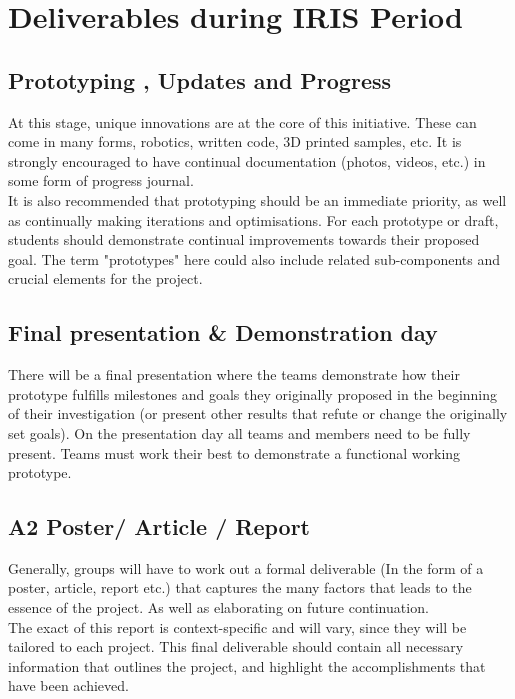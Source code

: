 \documentclass{report}
\begin{document}
       
	\section{Deliverables during IRIS Period}
	\subsection{Prototyping , Updates and Progress}
        At this stage, unique innovations are at the core of this initiative. These can come in many forms, robotics, written code, 3D printed samples, etc. It is strongly encouraged to have continual documentation (photos, videos, etc.) in some form of progress journal.\\
        
        \noindent 
        It is also recommended that prototyping should be an immediate priority, as well as continually making iterations and optimisations. For each prototype or draft, students should demonstrate continual improvements towards their proposed goal. The term "prototypes" here could also include related sub-components and crucial elements for the project.\\
        
        \subsection{Final presentation \& Demonstration day}
        There will be a final presentation where the teams demonstrate how their prototype fulfills milestones and goals they originally proposed in the beginning of their investigation (or present other results that refute or change the originally set goals). On the presentation day all teams and members need to be fully present. Teams must work their best to demonstrate a functional working prototype.
        \subsection{A2 Poster/ Article / Report}
        Generally, groups will have to work out a formal deliverable (In the form of a poster, article, report etc.) that captures the many factors that leads to the essence of the project. As well as elaborating on future continuation. \\
        The exact of this report is context-specific and will vary, since they will be tailored to each project. This final deliverable should contain all necessary information that outlines the project, and highlight the accomplishments that have been achieved.
       
\end{document}
